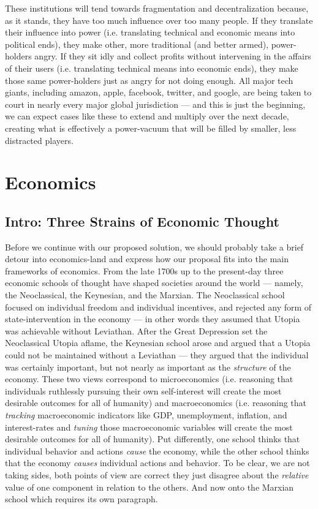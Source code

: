 \documentclass[a4paper]{article}
\begin{document}
These institutions will tend towards fragmentation and decentralization
because, as it stands, they have too much influence over too many
people. If they translate their influence into power (i.e. translating
technical and economic means into political ends), they make other, more
traditional (and better armed), power-holders angry. If they sit idly
and collect profits without intervening in the affairs of their users
(i.e. translating technical means into economic ends), they make those
same power-holders just as angry for not doing enough. All major tech
giants, including amazon, apple, facebook, twitter, and google, are
being taken to court in nearly every major global jurisdiction --- and
this is just the beginning, we can expect cases like these to extend and
multiply over the next decade, creating what is effectively a
power-vacuum that will be filled by smaller, less distracted players.

\section{Economics}
\subsection{Intro: Three Strains of Economic Thought}
Before we continue with our proposed solution, we should probably take a
brief detour into economics-land and express how our proposal fits into
the main frameworks of economics. From the late 1700s up to the
present-day three economic schools of thought have shaped societies
around the world --- namely, the Neoclassical, the Keynesian, and
the Marxian. The Neoclassical school focused on individual freedom and
individual incentives, and rejected any form of state-intervention in
the economy --- in other words they assumed that Utopia was achievable
without Leviathan. After the Great Depression set the
Neoclassical Utopia aflame, the Keynesian school arose and argued that a
Utopia could not be maintained without a Leviathan --- they argued that
the individual was certainly important, but not nearly as important as
the \emph{structure} of the economy. These two views correspond to
microeconomics (i.e. reasoning that individuals ruthlessly pursuing
their own self-interest will create the most desirable outcomes for all
of humanity) and macroeconomics (i.e. reasoning that \emph{tracking}
macroeconomic indicators like GDP, unemployment, inflation, and
interest-rates and \emph{tuning} those macroeconomic variables will
create the most desirable outcomes for all of humanity). Put
differently, one school thinks that individual behavior and actions
\emph{cause} the economy, while the other school thinks that the
economy \emph{causes} individual actions and behavior. To be clear, we
are not taking sides, both points of view are correct they just disagree
about the \emph{relative} value of one component in relation to the
others. And now onto the Marxian school which requires its own
paragraph.
\end{document}
